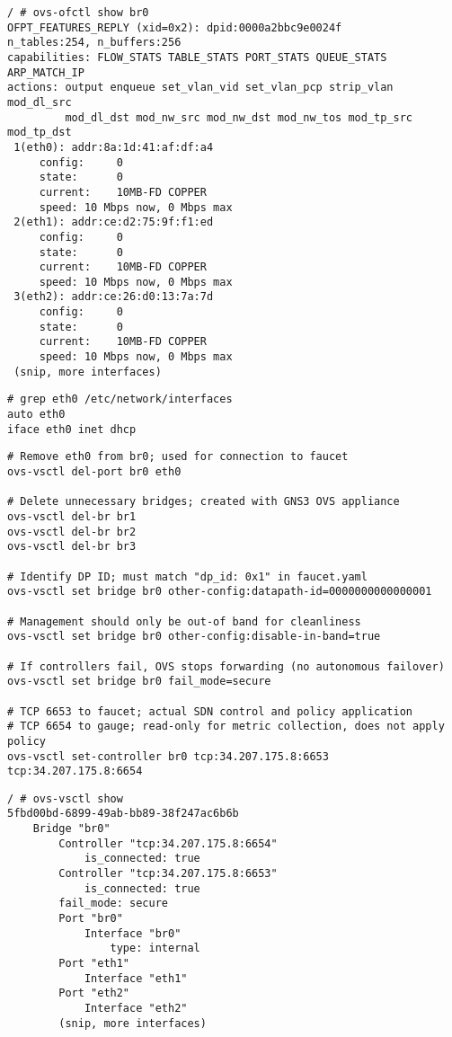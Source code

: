 \begin{verbatim}
/ # ovs-ofctl show br0
OFPT_FEATURES_REPLY (xid=0x2): dpid:0000a2bbc9e0024f
n_tables:254, n_buffers:256
capabilities: FLOW_STATS TABLE_STATS PORT_STATS QUEUE_STATS ARP_MATCH_IP
actions: output enqueue set_vlan_vid set_vlan_pcp strip_vlan mod_dl_src 
         mod_dl_dst mod_nw_src mod_nw_dst mod_nw_tos mod_tp_src mod_tp_dst
 1(eth0): addr:8a:1d:41:af:df:a4
     config:     0
     state:      0
     current:    10MB-FD COPPER
     speed: 10 Mbps now, 0 Mbps max
 2(eth1): addr:ce:d2:75:9f:f1:ed
     config:     0
     state:      0
     current:    10MB-FD COPPER
     speed: 10 Mbps now, 0 Mbps max
 3(eth2): addr:ce:26:d0:13:7a:7d
     config:     0
     state:      0
     current:    10MB-FD COPPER
     speed: 10 Mbps now, 0 Mbps max
 (snip, more interfaces)
\end{verbatim}



\begin{verbatim}
# grep eth0 /etc/network/interfaces
auto eth0
iface eth0 inet dhcp
\end{verbatim}



\begin{verbatim}
# Remove eth0 from br0; used for connection to faucet
ovs-vsctl del-port br0 eth0

# Delete unnecessary bridges; created with GNS3 OVS appliance
ovs-vsctl del-br br1
ovs-vsctl del-br br2
ovs-vsctl del-br br3

# Identify DP ID; must match "dp_id: 0x1" in faucet.yaml
ovs-vsctl set bridge br0 other-config:datapath-id=0000000000000001

# Management should only be out-of band for cleanliness
ovs-vsctl set bridge br0 other-config:disable-in-band=true

# If controllers fail, OVS stops forwarding (no autonomous failover)
ovs-vsctl set bridge br0 fail_mode=secure

# TCP 6653 to faucet; actual SDN control and policy application
# TCP 6654 to gauge; read-only for metric collection, does not apply policy
ovs-vsctl set-controller br0 tcp:34.207.175.8:6653 tcp:34.207.175.8:6654
\end{verbatim}

\begin{verbatim}
/ # ovs-vsctl show
5fbd00bd-6899-49ab-bb89-38f247ac6b6b
    Bridge "br0"
        Controller "tcp:34.207.175.8:6654"
            is_connected: true
        Controller "tcp:34.207.175.8:6653"
            is_connected: true
        fail_mode: secure
        Port "br0"
            Interface "br0"
                type: internal
        Port "eth1"
            Interface "eth1"
        Port "eth2"
            Interface "eth2"
        (snip, more interfaces)
\end{verbatim}

